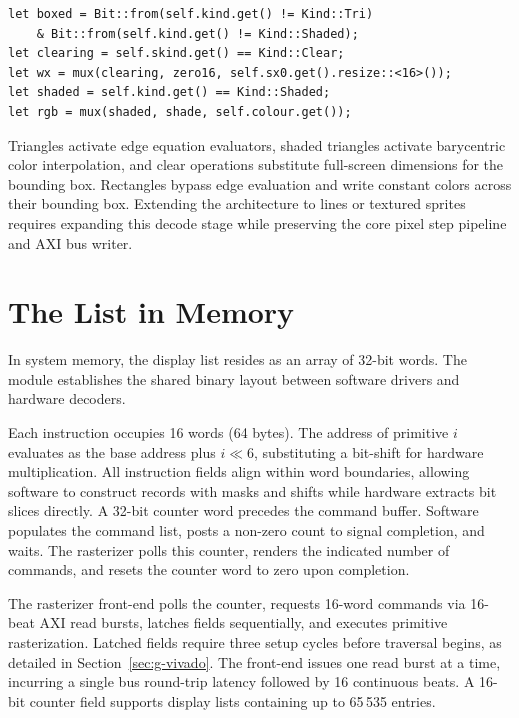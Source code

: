 \documentclass[journal,9pt]{IEEEtran}
\newcommand{\gpupart}[4]{%
}
\begin{document}
\begin{lstlisting}[frame=none,numbers=none]
let boxed = Bit::from(self.kind.get() != Kind::Tri)
    & Bit::from(self.kind.get() != Kind::Shaded);
let clearing = self.skind.get() == Kind::Clear;
let wx = mux(clearing, zero16, self.sx0.get().resize::<16>());
let shaded = self.kind.get() == Kind::Shaded;
let rgb = mux(shaded, shade, self.colour.get());
\end{lstlisting}

Triangles activate edge equation evaluators, shaded triangles activate
barycentric color interpolation, and clear operations substitute full-screen
dimensions for the bounding box. Rectangles bypass edge evaluation and write
constant colors across their bounding box. Extending the architecture to
lines or textured sprites requires expanding this decode stage while
preserving the core pixel step pipeline and AXI bus writer.

\section{The List in Memory}
\label{sec:g-mem}

In system memory, the display list resides as an array of 32-bit words. The
module  establishes the shared binary layout
between software drivers and hardware decoders.

\gpupart{dl.rs}{format}{Display list memory layout: 16 words per instruction
with aligned fields.}{lst:g-format}

Each instruction occupies 16 words (64 bytes). The address of primitive \(i\)
evaluates as the base address plus \(i \ll 6\), substituting a bit-shift for
hardware multiplication. All instruction fields align within word boundaries,
allowing software to construct records with masks and shifts while hardware
extracts bit slices directly. A 32-bit counter word precedes the command
buffer. Software populates the command list, posts a non-zero count to
signal completion, and waits. The rasterizer polls this counter, renders the
indicated number of commands, and resets the counter word to zero upon
completion.

The rasterizer front-end polls the counter, requests 16-word commands via
16-beat AXI read bursts, latches fields sequentially, and executes primitive
rasterization. Latched fields require three setup cycles before traversal
begins, as detailed in Section~\ref{sec:g-vivado}. The front-end issues one
read burst at a time, incurring a single bus round-trip latency followed by
16 continuous beats. A 16-bit counter field supports display lists containing
up to 65\,535 entries.
\end{document}
